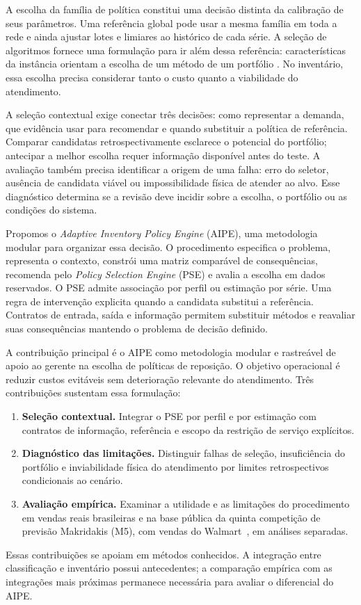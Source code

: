 \documentclass[preprint,12pt]{elsarticle}
\begin{document}
A escolha da família de política constitui uma decisão distinta da calibração de seus parâmetros. Uma referência global pode usar a mesma família em toda a rede e ainda ajustar lotes e limiares ao histórico de cada série. A seleção de algoritmos fornece uma formulação para ir além dessa referência: características da instância orientam a escolha de um método de um portfólio \cite{rice1976,Kotthoff2014AlgorithmSelection}. No inventário, essa escolha precisa considerar tanto o custo quanto a viabilidade do atendimento.

A seleção contextual exige conectar três decisões: como representar a demanda, que evidência usar para recomendar e quando substituir a política de referência. Comparar candidatas retrospectivamente esclarece o potencial do portfólio; antecipar a melhor escolha requer informação disponível antes do teste. A avaliação também precisa identificar a origem de uma falha: erro do seletor, ausência de candidata viável ou impossibilidade física de atender ao alvo. Esse diagnóstico determina se a revisão deve incidir sobre a escolha, o portfólio ou as condições do sistema.

Propomos o \textit{Adaptive Inventory Policy Engine} (AIPE), uma metodologia modular para organizar essa decisão. O procedimento especifica o problema, representa o contexto, constrói uma matriz comparável de consequências, recomenda pelo \textit{Policy Selection Engine} (PSE) e avalia a escolha em dados reservados. O PSE admite associação por perfil ou estimação por série. Uma regra de intervenção explicita quando a candidata substitui a referência. Contratos de entrada, saída e informação permitem substituir métodos e reavaliar suas consequências mantendo o problema de decisão definido.

A contribuição principal é o AIPE como metodologia modular e rastreável de apoio ao gerente na escolha de políticas de reposição. O objetivo operacional é reduzir custos evitáveis sem deterioração relevante do atendimento. Três contribuições sustentam essa formulação:
\begin{enumerate}
 \item \textbf{Seleção contextual.} Integrar o PSE por perfil e por estimação com contratos de informação, referência e escopo da restrição de serviço explícitos.
 \item \textbf{Diagnóstico das limitações.} Distinguir falhas de seleção, insuficiência do portfólio e inviabilidade física do atendimento por limites retrospectivos condicionais ao cenário.
 \item \textbf{Avaliação empírica.} Examinar a utilidade e as limitações do procedimento em vendas reais brasileiras e na base pública da quinta competição de previsão Makridakis (M5), com vendas do Walmart~\cite{Makridakis2022M5Accuracy}, em análises separadas.
\end{enumerate}
Essas contribuições se apoiam em métodos conhecidos. A integração entre classificação e inventário possui antecedentes; a comparação empírica com as integrações mais próximas permanece necessária para avaliar o diferencial do AIPE.
\end{document}

